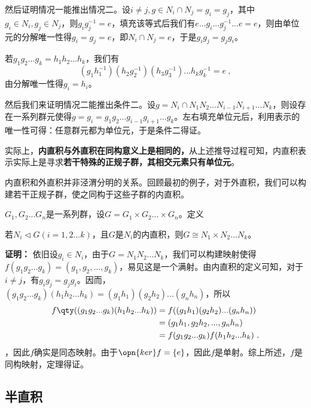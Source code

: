 然后证明情况一能推出情况二。设$i\neq j,g\in N_i\cap N_j=g_i=g_j$，其中$g_i\in N_i,g_j\in N_j$，则$g_ig_j^{-1}=e$，填充该等式后我们有$e...g_i...g_j^{-1}...e=e$，则由单位元的分解唯一性得$g_i=g_j=e$，即$N_i\cap N_j=e$，于是$g_ig_j=g_jg_i$。


若$g_1g_2...g_k=h_1h_2...h_k$，我们有
\begin{equation}
(g_1h_1^{-1})(h_2g_2^{-1})(h_3g_3^{-1})...h_kg_k^{-1}=e~,
\end{equation}
由分解唯一性得$g_i=h_i$。

然后我们来证明情况二能推出条件二。设$g=N_i\cap N_1N_2...N_{i-1}N_{i+1}...N_k$，则设存在一系列群元使得$g=g_i=g_1g_2...g_{i-1}g_{i+1}...g_k$。左右填充单位元后，利用表示的唯一性可得：任意群元都为单位元，于是条件二得证。


实际上，\textbf{内直积与外直积在同构意义上是相同的，}从上述推导过程可知，内直积表示实际上是寻求\textbf{若干特殊的正规子群，其相交元素只有单位元}。

内直积和外直积并非泾渭分明的关系。回顾最初的例子，对于外直积，我们可以构建若干正规子群，使之同构于这些子群的内直积。

\begin{theorem}{}
$G_1,G_2...G_n$是一系列群，设$G=G_1\times G_2...\times G_n$。定义
\
\end{theorem}

\begin{theorem}{}
若$N_i\triangleleft G(i=1,2...k)$，且$G$是$N_i$的内直积，则$G\cong N_1\times N_2...N_k$。
\end{theorem}
\textbf{证明：}
依旧设$g_i\in N_i$，由于$G=N_1N_2...N_k$，我们可以构建映射使得$f(g_1g_2...g_k)=(g_1,g_2,...,g_k)$，易见这是一个满射。由内直积的定义可知，对于$i\neq j$，有$g_ig_j=g_jg_i$。因而，$(g_1g_2...g_k)(h_1h_2...h_k)=(g_1h_1)(g_2h_2)...(g_nh_n)$，所以
\begin{equation}
\begin{aligned}
f\qty((g_1g_2...g_k)(h_1h_2...h_k))&=f((g_1h_1)(g_2h_2)...(g_nh_n))\\
&=(g_1h_1,g_2h_2,...,g_nh_n)\\
&=f(g_1g_2...g_k)f(h_1h_2...h_k)~.
\end{aligned}
\end{equation}
，因此$f$确实是同态映射。由于$\opn{ker}f=\{e\}$，因此$f$是单射。综上所述，$f$是同构映射，定理得证。


\subsection{半直积}

